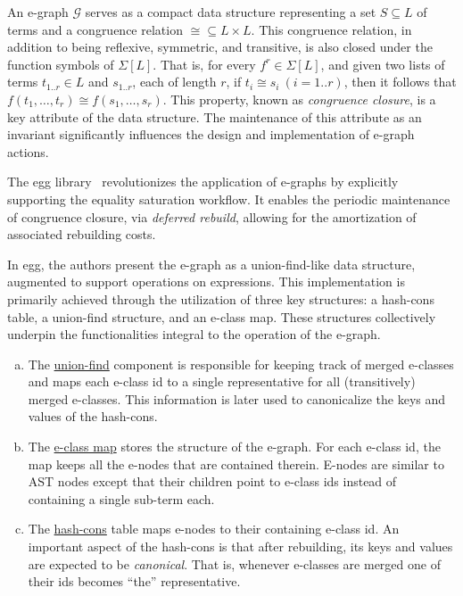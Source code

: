 An e-graph $\mathcal{G}$ serves as a compact data structure representing a set $S\subseteq L$ of terms and a congruence relation ${\cong}\subseteq L\times L$. This congruence relation, in addition to being reflexive, symmetric, and transitive, is also closed under the function symbols of $\Sigma[L]$. That is, for every $f^{r}\in\Sigma[L]$, and given two lists of terms $t_{1..r}\in L$ and $s_{1..r}$, each of length $r$, if $t_i\cong s_i ~ (i=1..r)$, then it follows that $f(t_1,\ldots,t_r)\cong f(s_1,\ldots,s_r)$. This property, known as \emph{congruence closure}, is a key attribute of the data structure. The maintenance of this attribute as an invariant significantly influences the design and implementation of e-graph actions.

The egg library~\cite{egg} revolutionizes the application of e-graphs by explicitly supporting the equality saturation workflow.
It enables the periodic maintenance of congruence closure, via \emph{deferred rebuild}, allowing for the amortization of associated rebuilding costs.

In egg, the authors present the e-graph as a union-find-like data structure, augmented to support operations on expressions.
This implementation is primarily achieved through the utilization of three key structures: a hash-cons table, a union-find structure, and an e-class map.
These structures collectively underpin the functionalities integral to the operation of the e-graph.

\begin{enumerate}[(a)]
%
\item The \underline{union-find} component is responsible for keeping track of merged e-classes and maps each e-class id to a single representative for all (transitively) merged e-classes.
This information is later used to canonicalize the keys and values of the hash-cons.
%
\item The \underline{e-class map} stores the structure of the e-graph.
For each e-class id, the map keeps all the e-nodes that are contained therein.
E-nodes are similar to AST nodes except that their children point to e-class ids instead of containing a single sub-term each.
%
\item The \underline{hash-cons} table maps e-nodes to their containing e-class id.
An important aspect of the hash-cons is that after rebuilding, its keys and values are expected to be \emph{canonical}. 
That is, whenever e-classes are merged one of their ids becomes ``the'' representative.
\end{enumerate}

